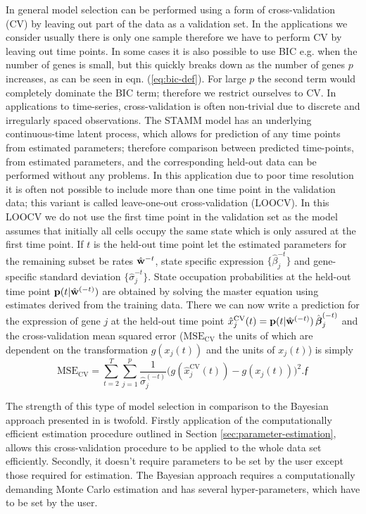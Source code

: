 In general model selection can be performed using a form of cross-validation (CV) by leaving out part of the data as a
validation set. In the applications we consider usually there is only one sample therefore we have to perform CV by leaving out time points.
In some cases it is also possible to use BIC  e.g. when the number of genes is small, but this quickly
breaks down as the number of genes $p$ increases, as can be seen in eqn. (\ref{eq:bic-def}). For large $p$ the second term would completely dominate the
BIC term; therefore we restrict ourselves to CV. In applications to time-series, cross-validation is often non-trivial due to discrete and irregularly spaced observations. The STAMM model has an underlying continuous-time latent process, which allows for prediction of any time points from estimated parameters; therefore comparison between predicted time-points, from estimated parameters, and the corresponding held-out data can be performed without any problems. In this application due to poor time resolution it is often not possible to include more than one time point in the validation data; this variant is called leave-one-out cross-validation (LOOCV). In this LOOCV we do not use the first time point in the validation set as the model assumes that initially all cells occupy the same state which is only assured at the first time point.  If $t$ is the held-out time point let the estimated parameters for the remaining subset be rates $\hat{\bf{w}}^{-t}$, state specific expression $\lbrace \hat{\beta}_j^{-t} \rbrace$ and gene-specific standard deviation $\lbrace \hat{\sigma}_j^{-t} \rbrace$. State occupation probabilities at the held-out time point  $\mathbf{p}(t| \hat{\bf{w}}^{(-t)})$ are obtained by solving the master equation using estimates derived from the training data. There we can now write a prediction for the expression of gene $j$ at the held-out time point $\hat{x}^{\mathrm{CV}}_j(t) = \mathbf{p}(t| \hat{\bf{w}}^{(-t)})\, \hat{\boldsymbol\beta}_j^{(-t)}$ and the cross-validation
mean squared error ($\mathrm{MSE_{CV}}$ the units of which are dependent on the transformation $g(x_j(t))$ and the units of $x_j(t)$) is simply
\begin{equation}
  \mathrm{MSE_{CV}}  =  \sum_{t=2}^T \sum_{j=1}^p \frac{1}{\hat{\sigma}_j^{(-t)}}\bigl( g(\hat{x}^{\mathrm{CV}}_j(t)) - g(x_j(t)) \bigr)^2.ƒ
  \label{eq:mse-cv}
\end{equation}

The strength of this type of model selection in comparison to the Bayesian approach presented in \cite{Armond:2013} is twofold. Firstly application of the computationally efficient estimation procedure outlined in Section \ref{sec:parameter-estimation}, allows this cross-validation procedure to be applied to the whole data set efficiently. Secondly, it doesn't require parameters to be set by the user except those required for estimation. The Bayesian approach requires a computationally demanding Monte Carlo estimation and has several hyper-parameters, which have to be set by the user.

